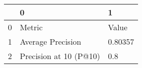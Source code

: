 \begin{tabular}{lll}
\toprule
{} &                       0 &        1 \\
\midrule
0 &                  Metric &    Value \\
1 &       Average Precision &  0.80357 \\
2 &  Precision at 10 (P@10) &      0.8 \\
\bottomrule
\end{tabular}
